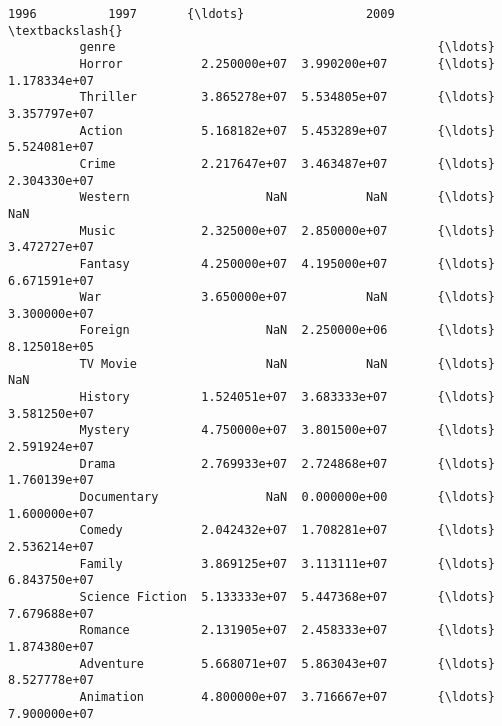 \documentclass[11pt]{article}
\begin{document}
\begin{Verbatim}[commandchars=\\\{\}]
                                   1996          1997       {\ldots}                 2009  \textbackslash{}
          genre                                             {\ldots}                        
          Horror           2.250000e+07  3.990200e+07       {\ldots}         1.178334e+07   
          Thriller         3.865278e+07  5.534805e+07       {\ldots}         3.357797e+07   
          Action           5.168182e+07  5.453289e+07       {\ldots}         5.524081e+07   
          Crime            2.217647e+07  3.463487e+07       {\ldots}         2.304330e+07   
          Western                   NaN           NaN       {\ldots}                  NaN   
          Music            2.325000e+07  2.850000e+07       {\ldots}         3.472727e+07   
          Fantasy          4.250000e+07  4.195000e+07       {\ldots}         6.671591e+07   
          War              3.650000e+07           NaN       {\ldots}         3.300000e+07   
          Foreign                   NaN  2.250000e+06       {\ldots}         8.125018e+05   
          TV Movie                  NaN           NaN       {\ldots}                  NaN   
          History          1.524051e+07  3.683333e+07       {\ldots}         3.581250e+07   
          Mystery          4.750000e+07  3.801500e+07       {\ldots}         2.591924e+07   
          Drama            2.769933e+07  2.724868e+07       {\ldots}         1.760139e+07   
          Documentary               NaN  0.000000e+00       {\ldots}         1.600000e+07   
          Comedy           2.042432e+07  1.708281e+07       {\ldots}         2.536214e+07   
          Family           3.869125e+07  3.113111e+07       {\ldots}         6.843750e+07   
          Science Fiction  5.133333e+07  5.447368e+07       {\ldots}         7.679688e+07   
          Romance          2.131905e+07  2.458333e+07       {\ldots}         1.874380e+07   
          Adventure        5.668071e+07  5.863043e+07       {\ldots}         8.527778e+07   
          Animation        4.800000e+07  3.716667e+07       {\ldots}         7.900000e+07   
          

\end{Verbatim}
\end{document}
